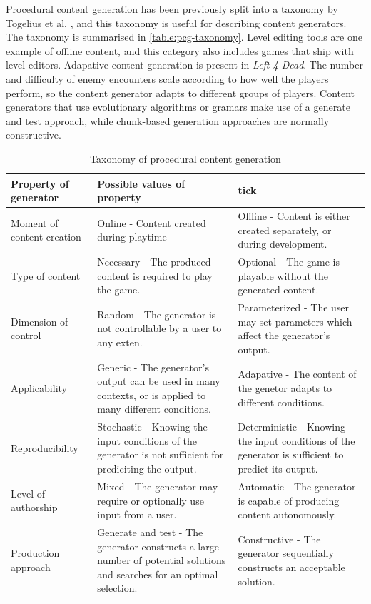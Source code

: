 Procedural content generation has been previously split into a taxonomy by Togelius et al.
\cite{togelius2011}, and this taxonomy is useful for describing content generators. The 
taxonomy is summarised in \autoref{table:pcg-taxonomy}. Level editing tools are one example
of offline content, and this category also includes games that ship with level editors.
Adapative content generation is present in \emph{Left 4 Dead}. The number and difficulty
of enemy encounters scale according to how well the players perform, so the content
generator adapts to different groups of players. Content generators that use evolutionary
algorithms or gramars make use of a generate and test approach, while chunk-based generation
approaches are normally constructive.

\begin{table}[ht]
\caption{Taxonomy of procedural content generation}
\label{table:pcg-taxonomy}
\begin{tabularx}{\textwidth}{| l | X | X |}

\hline
Property of generator & Possible values of property & tick\\
\hline

Moment of content creation & Online - Content created during playtime & Offline - Content is either created separately, or during development.\\
\hline
Type of content & Necessary - The produced content is required to play the game. & Optional - The game is playable without the generated content.\\
\hline
Dimension of control & Random - The generator is not controllable by a user to any exten. & Parameterized - The user may set parameters which affect the generator's output.\\
\hline
Applicability & Generic - The generator's output can be used in many contexts, or is applied to many different conditions. & Adapative - The content of the genetor adapts to different conditions.\\
\hline
Reproducibility & Stochastic - Knowing the input conditions of the generator is not sufficient for prediciting the output. & Deterministic - Knowing the input conditions of the generator is sufficient to predict its output.\\
\hline
Level of authorship & Mixed - The generator may require or optionally use input from a user. & Automatic - The generator is capable of producing content autonomously.\\
\hline
Production approach & Generate and test - The generator constructs a large number of potential solutions and searches for an optimal selection. & Constructive - The generator sequentially constructs an acceptable solution.\\
\hline

\end{tabularx}
\end{table}

